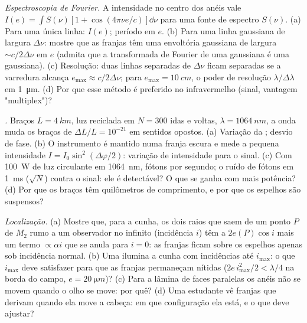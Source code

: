 \begin{exercise}[$\star\star\star$]\label{exo:b2:michelson:10}
\emph{Espectroscopia de Fourier.} A intensidade no centro dos anéis
vale $I(e) = \int S(\nu)[1 + \cos(4\pi\nu e/c)]\dd\nu$ para uma fonte de espectro
$S(\nu)$. (a) Para uma única linha: $I(e)$; período em $e$. (b) Para uma linha
gaussiana de largura $\Delta\nu$: mostre que as franjas têm uma envoltória gaussiana de
largura $\sim c/2\Delta\nu$ em $e$ (admita que a transformada de Fourier de uma gaussiana
é uma gaussiana). (c) Resolução: duas linhas separadas de $\Delta\nu$ ficam separadas se
a varredura alcança $e_{\max} \approx c/2\Delta\nu$; para $e_{\max} = \qty{10}{cm}$, o
poder de resolução $\lambda/\Delta\lambda$ em \qty{1}{\micro m}. (d) Por que esse método é
preferido no infravermelho (sinal, vantagem "multiplex")?
\end{exercise}

\begin{exercise}[$\star\star\star$]\label{exo:b2:michelson:11}
\emph{.} Braços $L = \qty{4}{km}$, luz reciclada
em $N = 300$ idas e voltas, $\lambda = \qty{1064}{nm}$, a onda muda os braços de
$\Delta L/L = 10^{-21}$ em sentidos opostos. (a) Variação da ;
desvio de fase. (b) O instrumento é mantido numa franja escura e mede
a pequena intensidade $I = I_0\sin^2(\Delta\varphi/2)$: variação de intensidade para o
sinal. (c) Com \qty{100}{W} de luz circulante em \qty{1064}{nm}, fótons
por segundo; o ruído de fótons em \qty{1}{ms} ($\sqrt N$) contra o sinal:
ele é detectável? O que se ganha com mais potência? (d) Por que os braços têm
quilômetros de comprimento, e por que os espelhos são suspensos?
\end{exercise}

\begin{exercise}[$\star\star\star$]\label{exo:b2:michelson:12}
\emph{Localização.} (a) Mostre que, para a cunha, os dois raios que saem de um
ponto $P$ de $M_2$ rumo a um observador no infinito (incidência $i$) têm a
 $2e(P)\cos i$ mais um termo $\propto\alpha i$ que se anula para
$i = 0$: as franjas ficam sobre os espelhos apenas sob incidência normal. (b)
Uma  ilumina a cunha com incidências até
$i_{\max}$: o que $i_{\max}$ deve satisfazer para que as franjas permaneçam nítidas
($2e\,i_{\max}^2/2 < \lambda/4$ na borda do campo, $e = \qty{20}{\micro m}$)? (c)
Para a lâmina de faces paralelas os anéis não se movem quando o olho se move:
por quê? (d) Uma estudante vê franjas que derivam quando ela move a cabeça:
em que configuração ela está, e o que deve ajustar?
\end{exercise}

